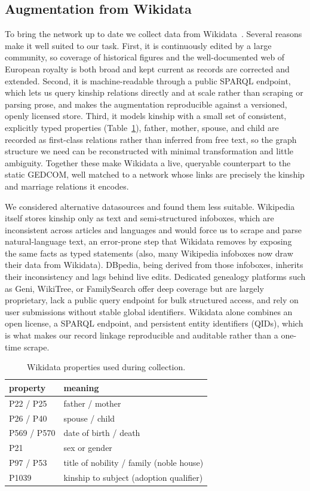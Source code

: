 \subsection{Augmentation from Wikidata}
\label{sub:wikidata}
To bring the network up to date we collect data from Wikidata~\cite{vrandecic2014wikidata}.
Several reasons make it well suited to our task. First, it is continuously edited by a
large community, so coverage of historical figures and the well-documented
web of European royalty is both broad and kept current as records are corrected and extended. Second,
it is machine-readable through a public SPARQL endpoint, which lets us query kinship relations
directly and at scale rather than scraping or parsing prose, and makes the augmentation
reproducible against a versioned, openly licensed store. Third, it models kinship with a small
set of consistent, explicitly typed properties (Table~\ref{tab:props}), father, mother, spouse,
and child are recorded as first-class relations rather than inferred from free text, so the
graph structure we need can be reconstructed with minimal transformation and little ambiguity.
Together these make Wikidata a live, queryable counterpart to the static GEDCOM, well matched
to a network whose links are precisely the kinship and marriage relations it encodes.

We considered alternative datasources and found them less suitable. Wikipedia
itself stores kinship only as text and semi-structured infoboxes, which are
inconsistent across articles and languages and would force us to scrape and parse
natural-language text, an error-prone step that Wikidata removes by
exposing the same facts as typed statements (also, many Wikipedia infoboxes now
draw their data from Wikidata). DBpedia, being derived from those infoboxes,
inherits their inconsistency and lags behind live edits. Dedicated genealogy
platforms such as Geni, WikiTree, or FamilySearch offer deep coverage but are
largely proprietary, lack a public query endpoint for
bulk structured access, and rely on user submissions without stable global
identifiers. Wikidata alone combines an open license, a SPARQL endpoint, and
persistent entity identifiers (QIDs), which is what makes our record
linkage reproducible and auditable rather than a one-time scrape.


\begin{table}[H]
\caption{Wikidata properties used during collection.}
\label{tab:props}
\centering\small
\begin{tabular}{ll}
\toprule
property & meaning \\
\midrule
P22 / P25 & father / mother \\
P26 / P40 & spouse / child \\
P569 / P570 & date of birth / death \\
P21 & sex or gender \\
P97 / P53 & title of nobility / family (noble house) \\
P1039 & kinship to subject (adoption qualifier) \\
\bottomrule
\end{tabular}
\end{table}

